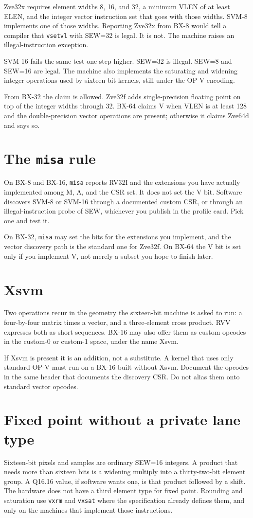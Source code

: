 Zve32x requires element widths 8, 16, and 32, a minimum VLEN of at least ELEN, and the integer vector instruction set that goes with those widths. SVM-8 implements one of those widths. Reporting Zve32x from BX-8 would tell a compiler that \texttt{vsetvl} with SEW=32 is legal. It is not. The machine raises an illegal-instruction exception.

SVM-16 fails the same test one step higher. SEW=32 is illegal. SEW=8 and SEW=16 are legal. The machine also implements the saturating and widening integer operations used by sixteen-bit kernels, still under the OP-V encoding.

From BX-32 the claim is allowed. Zve32f adds single-precision floating point on top of the integer widths through 32. BX-64 claims V when VLEN is at least 128 and the double-precision vector operations are present; otherwise it claims Zve64d and says so.

\section{The \texttt{misa} rule}

On BX-8 and BX-16, \texttt{misa} reports RV32I and the extensions you have actually implemented among M, A, and the CSR set. It does not set the V bit. Software discovers SVM-8 or SVM-16 through a documented custom CSR, or through an illegal-instruction probe of SEW, whichever you publish in the profile card. Pick one and test it.

On BX-32, \texttt{misa} may set the bits for the extensions you implement, and the vector discovery path is the standard one for Zve32f. On BX-64 the V bit is set only if you implement V, not merely a subset you hope to finish later.

\section{Xsvm}

Two operations recur in the geometry the sixteen-bit machine is asked to run: a four-by-four matrix times a vector, and a three-element cross product. RVV expresses both as short sequences. BX-16 may also offer them as custom opcodes in the custom-0 or custom-1 space, under the name Xsvm.

If Xsvm is present it is an addition, not a substitute. A kernel that uses only standard OP-V must run on a BX-16 built without Xsvm. Document the opcodes in the same header that documents the discovery CSR. Do not alias them onto standard vector opcodes.

\section{Fixed point without a private lane type}

Sixteen-bit pixels and samples are ordinary SEW=16 integers. A product that needs more than sixteen bits is a widening multiply into a thirty-two-bit element group. A Q16.16 value, if software wants one, is that product followed by a shift. The hardware does not have a third element type for fixed point. Rounding and saturation use \texttt{vxrm} and \texttt{vxsat} where the specification already defines them, and only on the machines that implement those instructions.
